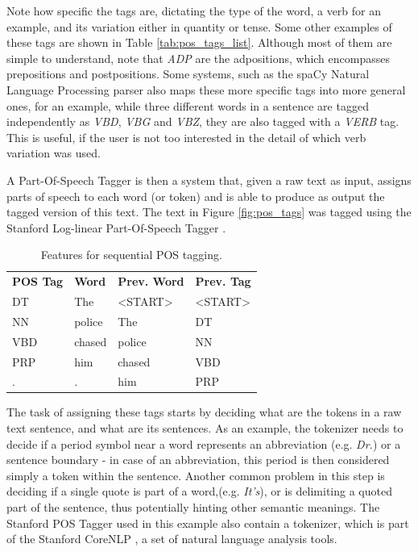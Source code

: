 \documentclass[11pt,a4paper,openright]{memoir}
\begin{document}
Note how specific the tags are, dictating the type of the word, a verb for an example, and its variation either in quantity or tense. Some other examples of these tags are shown in Table \ref{tab:pos_tags_list}. Although most of them are simple to understand, note that \emph{ADP} are the adpositions, which encompasses prepositions and postpositions. Some systems, such as the spaCy Natural Language Processing parser \cite{honnibal-johnson:2015:EMNLP, spacy} also maps these more specific tags into more general ones, for an example, while three different words in a sentence are tagged independently as \emph{VBD}, \emph{VBG} and \emph{VBZ}, they are also tagged with a \emph{VERB} tag. This is useful, if the user is not too interested in the detail of which verb variation was used.

A Part-Of-Speech Tagger is then a system that, given a raw text as input, assigns parts of speech to each word (or token) and is able to produce as output the tagged version of this text. The text in Figure \ref{fig:pos_tags} was tagged using the Stanford Log-linear Part-Of-Speech Tagger \cite{Toutanova:2003:FPT:1073445.1073478}.

\begin{table}[!htbp]
  \centering
    \begin{tabular}{llll}
      \textbf{POS Tag} & \textbf{Word} & \textbf{Prev. Word} & \textbf{Prev. Tag}  \\
      DT               & The           & <START>             & <START>             \\
      NN               & police        & The                 & DT                  \\
      VBD              & chased        & police              & NN                  \\
      PRP              & him           & chased              & VBD                 \\
      .                & .             & him                 & PRP                 \\             
    \end{tabular}
  \caption[Features for sequential POS tagging.]{Features for sequential POS tagging.}
  \label{tab:pos_tags_features}
\end{table}

The task of assigning these tags starts by deciding what are the tokens in a raw text sentence, and what are its sentences. As an example, the tokenizer needs to decide if a period symbol near a word represents an abbreviation (e.g. \emph{Dr.}) or a sentence boundary - in case of an abbreviation, this period is then considered simply a token within the sentence. Another common problem in this step is deciding if a single quote is part of a word,(e.g. \emph{It's}), or is delimiting a quoted part of the sentence, thus potentially hinting other semantic meanings. The Stanford POS Tagger used in this example also contain a tokenizer, which is part of the Stanford CoreNLP \cite{manning-EtAl:2014:P14-5}, a set of natural language analysis tools.
\end{document}
